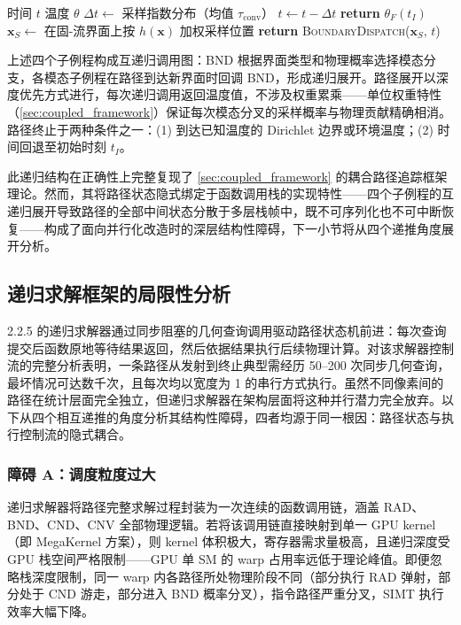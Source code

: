 \begin{algorithm}
\caption{对流子路径（CNV）}
\label{alg:cnv}
\begin{algorithmic}[1]
\REQUIRE 时间 $t$
\ENSURE 温度 $\theta$
\STATE $\Delta t \leftarrow$ 采样指数分布（均值 $\tau_\text{conv}$）
\STATE $t \leftarrow t - \Delta t$ 
  \STATE \textbf{return} $\theta_F(t_I)$ 
\ENDIF
\STATE $\mathbf{x}_S \leftarrow$ 在固-流界面上按 $h(\mathbf{x})$ 加权采样位置
\STATE \textbf{return} \textsc{BoundaryDispatch}($\mathbf{x}_S,\,t$) 
\end{algorithmic}
\end{algorithm}

上述四个子例程构成互递归调用图：BND 根据界面类型和物理概率选择模态分支，各模态子例程在路径到达新界面时回调 BND，形成递归展开。路径展开以深度优先方式进行，每次递归调用返回温度值，不涉及权重累乘——单位权重特性（\ref{sec:coupled_framework}）保证每次模态分叉的采样概率与物理贡献精确相消。路径终止于两种条件之一：(1) 到达已知温度的 Dirichlet 边界或环境温度；(2) 时间回退至初始时刻 $t_I$。

此递归结构在正确性上完整复现了 \ref{sec:coupled_framework} 的耦合路径追踪框架理论。然而，其将路径状态隐式绑定于函数调用栈的实现特性——四个子例程的互递归展开导致路径的全部中间状态分散于多层栈帧中，既不可序列化也不可中断恢复——构成了面向并行化改造时的深层结构性障碍，下一小节将从四个递推角度展开分析。

\subsection{递归求解框架的局限性分析}
\label{sec:dfs_limitations}

2.2.5 的递归求解器通过同步阻塞的几何查询调用驱动路径状态机前进：每次查询提交后函数原地等待结果返回，然后依据结果执行后续物理计算。对该求解器控制流的完整分析表明，一条路径从发射到终止典型需经历 50--200 次同步几何查询，最坏情况可达数千次，且每次均以宽度为 1 的串行方式执行。虽然不同像素间的路径在统计层面完全独立，但递归求解器在架构层面将这种并行潜力完全放弃。以下从四个相互递推的角度分析其结构性障碍，四者均源于同一根因：路径状态与执行控制流的隐式耦合。

\subsubsection{障碍 A：调度粒度过大}

递归求解器将路径完整求解过程封装为一次连续的函数调用链，涵盖 RAD、BND、CND、CNV 全部物理逻辑。若将该调用链直接映射到单一 GPU kernel（即 MegaKernel 方案），则 kernel 体积极大，寄存器需求量极高，且递归深度受 GPU 栈空间严格限制——GPU 单 SM 的 warp 占用率远低于理论峰值。即便忽略栈深度限制，同一 warp 内各路径所处物理阶段不同（部分执行 RAD 弹射，部分处于 CND 游走，部分进入 BND 概率分叉），指令路径严重分叉，SIMT 执行效率大幅下降。

